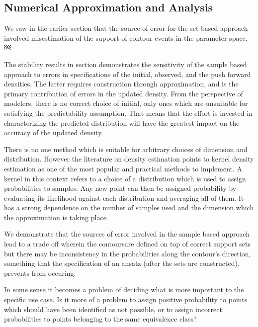 \subsection{Numerical Approximation and Analysis}\label{sec:sample-approx}

We saw in the earlier section that the source of error for the set based approach involved misestimation of the support of contour events in the parameter space. ￼

The stability results in section demonstrates the sensitivity of the sample based approach to errors in specifications of the initial, observed, and the push forward densities.
The latter requires construction through approximation, and is the primary contribution of errors in the updated density.
From the perspective of modelers, there is no correct choice of initial, only ones which are unsuitable for satisfying the predictability assumption.
That means that the effort is invested in characterizing the predicted distribution will have the greatest impact on the accuracy of the updated density.

There is no one method which is suitable for arbitrary choices of dimension and distribution.
However the literature on density estimation points to kernel density estimation as one of the most popular and practical methods to implement.
A kernel in this context refers to a choice of a distribution which is used to assign probabilities to samples.
Any new point can then be assigned probability by evaluating its likelihood against each distribution and averaging all of them.
It has a strong dependence on the number of samples used and the dimension which the approximation is taking place.

We demonstrate that the sources of error involved in the sample based approach lead to a trade off wherein the contoursare defined on top of correct support sets but there may be inconsistency in the probabilities along the contour's direction, something that the specification of an ansatz (after the sets are constructed), prevents from occuring.

In some sense it becomes a problem of deciding what is more important to the specific use case.
Is it more of a problem to assign positive probability to points which should have been identified as not possible, or to assign incorrect probabilities to points belonging to the same equivalence class?
